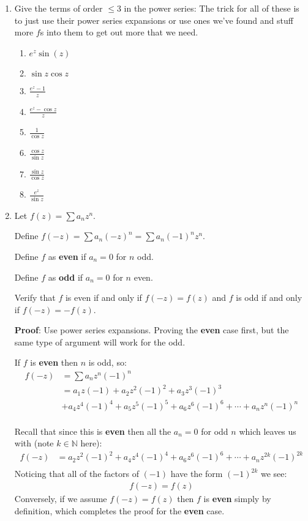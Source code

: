 \begin{enumerate}

    \item Give the terms of order $\leq 3$ in the power series:
    The trick for all of these is to just use their power series expansions or use ones we've found and stuff more $f$s into them 
    to get out more that we need.
    \begin{enumerate}
      \item $e^z \sin(z)$
      \item $\sin z \cos z$
      \item $\frac{e^z - 1}{z}$
      \item $\frac{e^z - \cos z}{z}$
      \item $\frac{1}{\cos z}$
      \item $\frac{\cos z}{\sin z}$
      \item $\frac{\sin z}{\cos z}$
      \item $\frac{e^z}{\sin z}$
    \end{enumerate}
    
    \item Let $f(z) = \sum a_n z^n$.
  
    Define $f(-z) = \sum a_n (-z)^n = \sum a_n(-1)^n z^n$.
  
    Define $f$ as \textbf{even} if $a_n = 0$ for $n$ odd.
  
    Define $f$ as \textbf{odd} if $a_n = 0$ for $n$ even.
  
    Verify that $f$ is even if and only if $f(-z) = f(z)$ and $f$ is odd if and only if $f(-z) = -f(z).$
  
    \textbf{Proof}:
    Use power series expansions. Proving the \textbf{even} case first, but the same type of argument will work for the odd.
  
    If $f$ is \textbf{even} then $n$ is odd, so:
    \begin{align*}
      f(-z) &= \sum a_n z^n (-1)^n \\
      &= a_1 z (-1) + a_2 z^2 (-1)^2 + a_3 z^3 (-1)^3 \\
      &+ a_4 z^4 (-1)^4 + a_5 z^5 (-1)^5 + a_6 z^6 (-1)^6 + \cdots + a_n z^n (-1)^n \\
    \end{align*}
  
    Recall that since this is \textbf{even} then all the $a_n = 0$ for odd $n$ which leaves us 
    with (note $k \in \mathbb{N}$ here):
    \begin{align*}
      f(-z) &= a_2 z^2 (-1)^2 + a_4 z^4 (-1)^4 + a_6 z^6 (-1)^6 + \cdots + a_n z^{2k} (-1)^{2k} \\
    \end{align*} 
    Noticing that all of the factors of $(-1)$ have the form $(-1)^{2k}$ we see:
    \begin{align*}
      f(-z) = f(z)
    \end{align*}
    Conversely, if we assume $f(-z) = f(z)$ then $f$ is \textbf{even} simply by definition, 
    which completes the proof for the \textbf{even} case. 
    

\end{enumerate}
